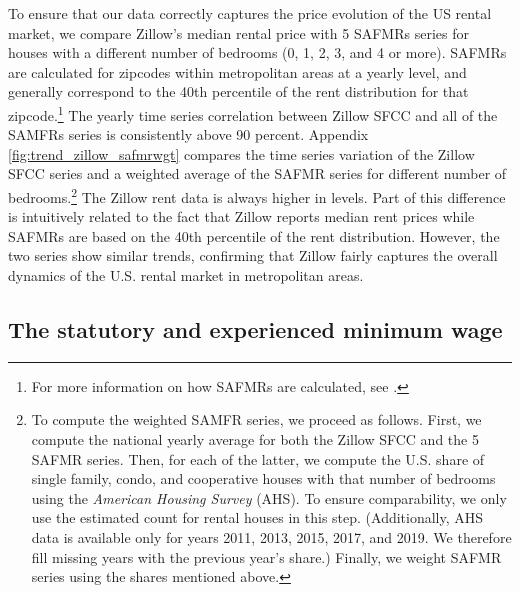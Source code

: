 To ensure that our data correctly captures the price evolution of the US rental market, 
we compare Zillow's median rental price with 5 SAFMRs series for houses with a different 
number of bedrooms (0, 1, 2, 3, and 4 or more). SAFMRs are calculated for zipcodes within 
metropolitan areas at a yearly level, and generally correspond to the 40th percentile of 
the rent distribution for that zipcode.\footnote{For more information on how SAFMRs are 
	calculated, see \textcite[][page 41641]{hudPreamble}.} 
The yearly time series correlation between Zillow SFCC and all of the SAMFRs series is 
consistently above 90 percent. Appendix \autoref{fig:trend_zillow_safmrwgt} 
compares the time series variation of the Zillow SFCC series and a weighted average of 
the SAFMR series for different number of bedrooms.\footnote{
	\label{foot:zillow_time_series}
	To compute the weighted SAMFR series, we proceed as follows. First, we compute the 
	national yearly average for both the Zillow SFCC and the 5 	SAFMR series. Then, for 
	each of the latter, we compute the U.S. share of single family, condo, and cooperative 
	houses with that number of bedrooms using the \textit{American Housing Survey} (AHS). 
	To ensure comparability, we only use the estimated count for rental houses in this 
	step. (Additionally, AHS data is available only for years 2011, 2013, 2015, 2017, and 
	2019. We therefore fill missing years with the previous year's share.) Finally, we weight 
	SAFMR series using the shares mentioned above.} 
The Zillow rent data is always higher in levels. Part of this difference is intuitively 
related to the fact that Zillow reports median rent prices while SAFMRs are based on the 
40th percentile of the rent distribution. However, the two series show similar trends, 
confirming that Zillow fairly captures the overall dynamics of the U.S. rental 
market in metropolitan areas.

\subsection{The statutory and experienced minimum wage}\label{sec:mw_construction}

